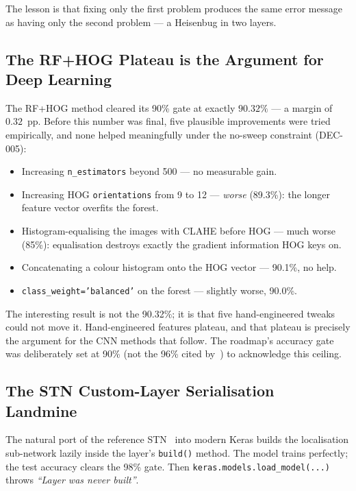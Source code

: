 \documentclass[11pt,a4paper]{article}
\begin{document}
The lesson is that fixing only the first problem produces the same error message as having only the second problem — a Heisenbug in two layers.

\subsection{The RF+HOG Plateau is the Argument for Deep Learning}
\label{sec:rf-plateau}
The RF+HOG method cleared its 90\% gate at exactly $90.32\%$ — a margin of $0.32$~pp. Before this number was final, five plausible improvements were tried empirically, and none helped meaningfully under the no-sweep constraint (DEC-005):
\begin{itemize}
  \item Increasing \texttt{n\_estimators} beyond 500 — no measurable gain.
  \item Increasing HOG \texttt{orientations} from 9 to 12 — \emph{worse} (89.3\%): the longer feature vector overfits the forest.
  \item Histogram-equalising the images with CLAHE before HOG — much worse (85\%): equalisation destroys exactly the gradient information HOG keys on.
  \item Concatenating a colour histogram onto the HOG vector — 90.1\%, no help.
  \item \texttt{class\_weight='balanced'} on the forest — slightly worse, 90.0\%.
\end{itemize}

The interesting result is not the 90.32\%; it is that five hand-engineered tweaks could not move it. Hand-engineered features plateau, and that plateau is precisely the argument for the CNN methods that follow. The roadmap's accuracy gate was deliberately set at 90\% (not the 96\% cited by~\cite{zaklouta2011realtime}) to acknowledge this ceiling.

\subsection{The STN Custom-Layer Serialisation Landmine}
\label{sec:stn-serialisation}
The natural port of the reference STN~\cite{jaderberg2015stn,hello2allgtsrb} into modern Keras builds the localisation sub-network lazily inside the layer's \texttt{build()} method. The model trains perfectly; the test accuracy clears the 98\% gate. Then \texttt{keras.models.load\_model(...)} throws \emph{``Layer was never built''}.
\end{document}
